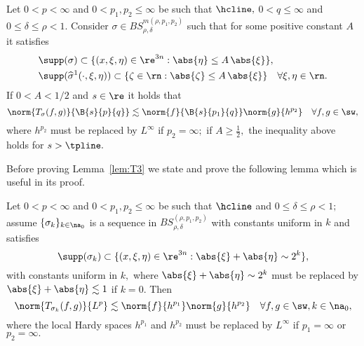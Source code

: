 \begin{lemma}\label{lem:T3}  Let $0<p<\infty$ and $0<p_1,p_2\le \infty$ be such that $\hcline,$ $0<q\le \infty$  and  $0\le \delta\le \rho<1.$   Consider $\sigma\in BS^{m(\rho,p_1,p_2)}_{\rho,\delta}$  such that for some positive constant $A$ it satisfies
\begin{align}
&\supp(\sigma)\subset\{(x,\xi,\eta)\in \re^{3n}: \abs{\eta}\le A\, \abs{\xi}\},\label{eq:supp1}\\
&\supp(\widehat{\sigma}^1(\cdot,\xi,\eta)) \subset\{\zeta\in\rn: \abs{\zeta}\le A\, \abs{\xi}\}\quad \forall \xi,\eta\in\rn. \label{eq:supp2}
\end{align}
 If $0<A<1/2$ and $s\in\re$ it holds that
\begin{equation*}
\norm{T_\sigma(f,g)}{\B{s}{p}{q}}\lesssim \norm{f}{\B{s}{p_1}{q}}\norm{g}{h^{p_2}} \quad \forall f,g\in \sw,
\end{equation*}
where $h^{p_2}$ must be replaced by $L^\infty$ if $p_2=\infty;$  if $A\ge\frac{1}{2},$ the inequality above holds for $s>\tpline.$ 
\end{lemma}
 



Before proving Lemma~\ref{lem:T3} we state and prove the following lemma which is useful in its proof.

\begin{lemma}\label{lem:Tsk:bound} Let $0<p<\infty$ and $0<p_1,p_2\le \infty$  be such that $\hcline$ and $0\le \delta\le \rho<1;$ assume $\{\sigma_k\}_{k\in \na_0}$ is a sequence in $BS^{(\rho,p_1,p_2)}_{\rho,\delta}$  with constants uniform in $k$ and satisfies 
\begin{equation*}
\supp(\sigma_k)\subset \{(x,\xi,\eta)\in \re^{3n}: \abs{\xi}+\abs{\eta}\sim 2^k\},
\end{equation*}
with constants uniform in $k,$  where  $\abs{\xi}+\abs{\eta}\sim 2^k$ must be replaced by $\abs{\xi}+\abs{\eta}\lesssim 1$ if $k=0.$
Then 
\begin{equation*}
\norm{T_{\sigma_k}(f,g)}{L^p}\lesssim \norm{f}{h^{p_1}}\norm{g}{h^{p_2}}\quad \forall f,g\in\sw,k\in\na_0,
\end{equation*}
where the local Hardy spaces $h^{p_1}$ and $h^{p_2}$ must be replaced by $L^\infty$ if $p_1=\infty$ or $p_2=\infty.$
\end{lemma}

